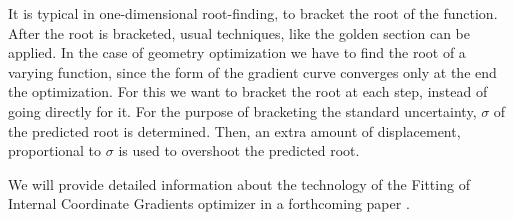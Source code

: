 \documentclass[prl,aps,twocolumn,showpacs,twocolumngrid,superbib]{revtex4}
\begin{document}
It is typical in one-dimensional root-finding, to bracket the root of
the function. After the root is bracketed, usual techniques, like
the golden section can be applied. In the case of geometry optimization
we have to find the root of a varying function, since the form of
the gradient curve converges only at the end the optimization.
For this we want to bracket the root at each step, instead of
going directly for it. For the purpose of bracketing the standard 
uncertainty, $\sigma$ of the predicted root is determined. 
Then, an extra amount of displacement, proportional to $\sigma$
is used to overshoot the predicted root.


We will provide detailed information about the technology of 
the Fitting of Internal Coordinate Gradients
optimizer in a forthcoming paper \cite{bisect-paper}.
\end{document}
